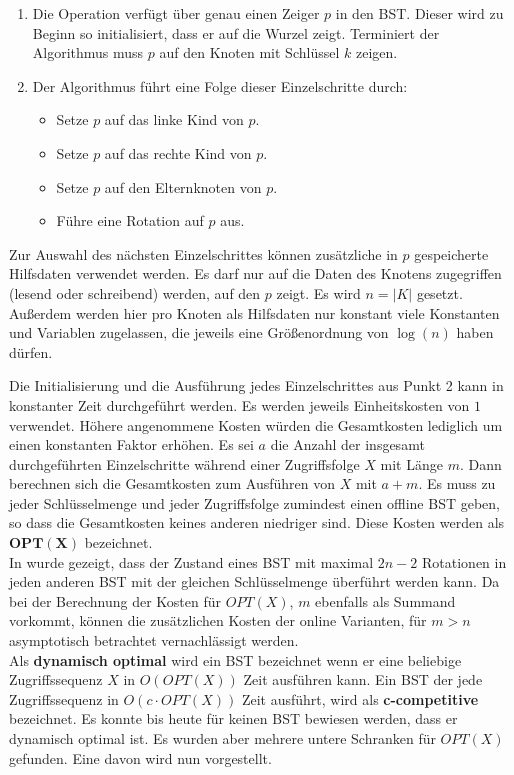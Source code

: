 \documentclass[a4paper,12pt]{article}
\begin{document}
\begin{enumerate} 
	\item Die Operation verfügt über genau einen Zeiger $p$ in den BST. Dieser wird zu Beginn so initialisiert, dass er auf die Wurzel zeigt. Terminiert der Algorithmus muss $p$ auf den Knoten mit Schlüssel $k$ zeigen.
	\item Der Algorithmus führt eine Folge dieser Einzelschritte durch:
	\begin{itemize}
		\item Setze $p$ auf das linke Kind von $p$.
		\item Setze $p$ auf das rechte Kind von $p$.
		\item Setze $p$ auf den Elternknoten von $p$.
		\item Führe eine Rotation auf $p$ aus.
	\end{itemize}  
	
\end{enumerate}


\noindent 	Zur Auswahl des nächsten Einzelschrittes können zusätzliche in $p$ gespeicherte Hilfsdaten verwendet werden. Es darf nur auf die Daten des Knotens zugegriffen (lesend oder schreibend) werden, auf den $p$ zeigt. Es wird $n = \vert K \vert$ gesetzt. Außerdem werden hier pro Knoten als Hilfsdaten nur konstant viele Konstanten und Variablen zugelassen, die jeweils eine Größenordnung von $\log \left(n\right)$  haben dürfen.

\noindent Die Initialisierung und die Ausführung jedes Einzelschrittes aus Punkt 2 kann in konstanter Zeit durchgeführt werden. Es werden jeweils Einheitskosten von $1$ verwendet. Höhere angenommene Kosten würden die Gesamtkosten lediglich um einen konstanten Faktor erhöhen. Es sei $a$ die Anzahl der insgesamt durchgeführten Einzelschritte während einer Zugriffsfolge $X$ mit Länge $m$. Dann berechnen sich die Gesamtkosten zum Ausführen von $X$ mit $a + m$. Es muss zu jeder Schlüsselmenge und jeder Zugriffsfolge zumindest einen offline BST geben, so dass die Gesamtkosten keines anderen niedriger sind. Diese Kosten werden als $\mathbf{OPT\left(X\right)}$ bezeichnet.\\  In \cite{nRotations} wurde gezeigt, dass der Zustand eines BST mit maximal $2n -2$ Rotationen in jeden anderen BST mit der gleichen Schlüsselmenge überführt werden kann. Da bei der Berechnung der Kosten für  $\mathit{OPT(X)}$, $m$ ebenfalls als Summand vorkommt, können die zusätzlichen Kosten der online Varianten, für $m > n$ asymptotisch betrachtet vernachlässigt werden. \\
\noindent Als \textbf{dynamisch optimal } wird ein BST bezeichnet wenn er eine beliebige Zugriffssequenz $X$ in $O\left(\mathit{OPT}\left(X\right)\right)$ Zeit ausführen kann. Ein BST der jede Zugriffssequenz in $O\left(c \cdot \mathit{OPT}\left(X\right)\right)$ Zeit ausführt, wird als \textbf{c-competitive} bezeichnet. Es konnte bis heute für keinen BST bewiesen werden, dass er dynamisch optimal ist. Es wurden aber mehrere untere Schranken für $\mathit{OPT}\left(X\right)$ gefunden. Eine davon wird  nun vorgestellt.
\end{document}
